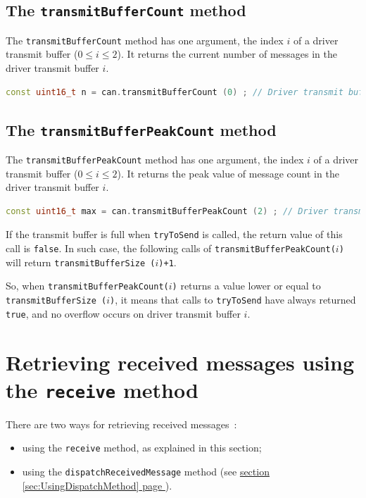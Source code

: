 \documentclass[9pt, a4paper, obeyspaces]{extarticle}
\newcommand \sectionLabel[2]{\section{#1}\label{sec:#2}}
\newcommand\refSectionPage[1]{\hyperref[sec:#1]{section \ref*{sec:#1} page \pageref{sec:#1}}}
\begin{document}
\subsection{The \texttt{transmitBufferCount} method}

The \texttt{transmitBufferCount} method has one argument, the index $i$ of a driver transmit buffer ($0 \leqslant i \leqslant 2$). It returns the current number of messages in the driver transmit buffer $i$.
{ \small\begin{lstlisting}[language=c++]
const uint16_t n = can.transmitBufferCount (0) ; // Driver transmit buffer 0
\end{lstlisting}}


\subsection{The \texttt{transmitBufferPeakCount} method}

The \texttt{transmitBufferPeakCount} method has one argument, the index $i$ of a driver transmit buffer ($0 \leqslant i \leqslant 2$). It returns the peak value of message count in the driver transmit buffer $i$.
{ \small\begin{lstlisting}[language=c++]
const uint16_t max = can.transmitBufferPeakCount (2) ; // Driver transmit buffer 2
\end{lstlisting}}

If the transmit buffer is full when \texttt{tryToSend} is called, the return value of this call is \texttt{false}. In such case, the following calls of \texttt{transmitBufferPeakCount($i$)} will return \texttt{transmitBufferSize ($i$)+1}. 

So, when \texttt{transmitBufferPeakCount($i$)} returns a value lower or equal to \texttt{transmitBufferSize ($i$)}, it means that calls to \texttt{tryToSend} have always returned \texttt{true}, and no overflow occurs on driver transmit buffer $i$.

















\sectionLabel{Retrieving received messages using the \texttt{receive} method}{UsingReceiveMethod}

There are two ways for retrieving received messages~:
\begin{itemize}
  \item using the \texttt{receive} method, as explained in this section;
  \item using the \texttt{dispatchReceivedMessage} method (see \refSectionPage{UsingDispatchMethod}).
\end{itemize}
\end{document}
